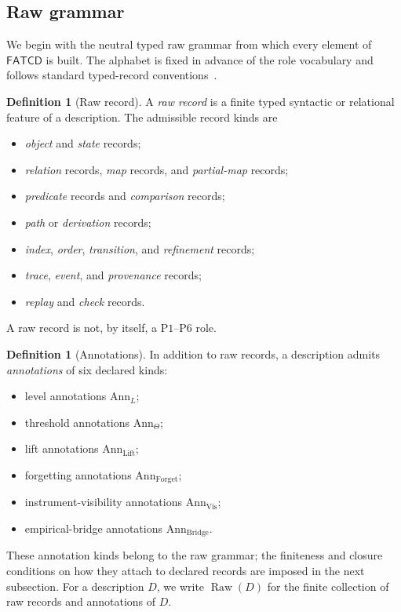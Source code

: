 \documentclass[11pt]{article}
\theoremstyle{definition}
\newtheorem{definition}[theorem]{Definition}
\newcommand{\FATCD}{\ensuremath{\mathsf{FATCD}}}
\newcommand{\Raw}[1]{\ensuremath{\operatorname{Raw}\!\left(#1\right)}}
\newcommand{\Pone}{\ensuremath{\mathrm{P1}}}
\newcommand{\Psix}{\ensuremath{\mathrm{P6}}}
\begin{document}
\subsection{Raw grammar}\label{subsec:raw-grammar}

We begin with the neutral typed raw grammar from which every element
of \FATCD{} is built. The alphabet is fixed in advance of the role
vocabulary and follows standard typed-record
conventions~\citep{CardelliMitchell1991}.

\begin{definition}[Raw record]\label{def:raw-record}
A \emph{raw record} is a finite typed syntactic or relational feature of a
description. The admissible record kinds are
\begin{itemize}[topsep=2pt,itemsep=1pt]
  \item \emph{object} and \emph{state} records;
  \item \emph{relation} records, \emph{map} records, and \emph{partial-map}
    records;
  \item \emph{predicate} records and \emph{comparison} records;
  \item \emph{path} or \emph{derivation} records;
  \item \emph{index}, \emph{order}, \emph{transition}, and \emph{refinement}
    records;
  \item \emph{trace}, \emph{event}, and \emph{provenance} records;
  \item \emph{replay} and \emph{check} records.
\end{itemize}
A raw record is not, by itself, a \Pone{}--\Psix{} role.
\end{definition}

\begin{definition}[Annotations]\label{def:annotations}
In addition to raw records, a description admits \emph{annotations} of six
declared kinds:
\begin{itemize}[topsep=2pt,itemsep=1pt]
  \item level annotations \(\mathrm{Ann}_L\);
  \item threshold annotations \(\mathrm{Ann}_\Theta\);
  \item lift annotations \(\mathrm{Ann}_{\mathrm{Lift}}\);
  \item forgetting annotations \(\mathrm{Ann}_{\mathrm{Forget}}\);
  \item instrument-visibility annotations \(\mathrm{Ann}_{\mathrm{Vis}}\);
  \item empirical-bridge annotations \(\mathrm{Ann}_{\mathrm{Bridge}}\).
\end{itemize}
These annotation kinds belong to the raw grammar; the finiteness and closure
conditions on how they attach to declared records are imposed in the next
subsection. For a description \(D\), we write \(\Raw{D}\) for the finite
collection of raw records and annotations of \(D\).
\end{definition}
\end{document}
